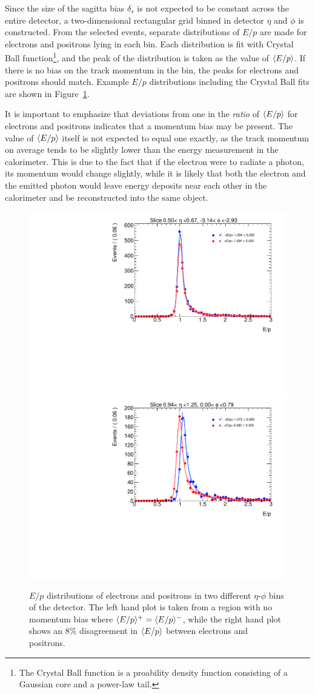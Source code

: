 Since the size of the sagitta bias $\delta_s$ is not expected to be constant across the entire detector, a two-dimensional rectangular grid binned in detector $\eta$ and $\phi$ is constructed.
From the selected events, separate distributions of $E/p$ are made for electrons and positrons lying in each bin.
Each distribution is fit with Crystal Ball function\footnote{The Crystal Ball function is a proability density function consisting of a Gaussian core and a power-law tail.}, and the peak of the distribution is taken as the value of $\langle E/p\rangle$.
If there is no bias on the track momentum in the bin, the peaks for electrons and positrons should match.
Example $E/p$ distributions including the Crystal Ball fits are shown in Figure~\ref{fig:alignment_eop_fit}.

It is important to emphasize that deviations from one in the \emph{ratio} of $\langle E/p\rangle$ for electrons and positrons indicates that a momentum bias may be present.
The value of $\langle E/p\rangle$ itself is not expected to equal one exactly, as the track momentum on average tends to be slightly lower than the energy measurement in the calorimeter.
This is due to the fact that if the electron were to radiate a photon, its momentum would change slightly, while it is likely that both the electron and the emitted photon would leave energy deposits near each other in the calorimeter and be reconstructed into the same object. 

\begin{figure}[htbp]
  \centering
  \includegraphics[width=.48\textwidth]{figs/alignment/eop/eop_fit_nobias}
  \includegraphics[width=.48\textwidth]{figs/alignment/eop/eop_fit_bias}
  \caption{$E/p$ distributions of electrons and positrons in two different $\eta$-$\phi$ bins of the detector.  The left hand plot is taken from a region with no momentum bias where $\langle E/p\rangle^+ = \langle E/p\rangle^-$, while the right hand plot shows an 8\% disagreement in $\langle E/p\rangle$ between electrons and positrons.}
  \label{fig:alignment_eop_fit}
\end{figure}

